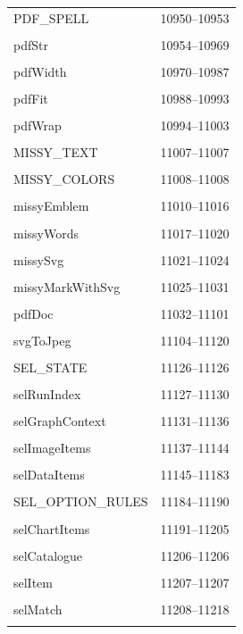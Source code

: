 {\begin{longtable}{@{}p{11cm}r@{}}
PDF\_SPELL & 10950--10953 \\\\\hline
pdfStr & 10954--10969 \\\\\hline
pdfWidth & 10970--10987 \\\\\hline
pdfFit & 10988--10993 \\\\\hline
pdfWrap & 10994--11003 \\\\\hline
MISSY\_TEXT & 11007--11007 \\\\\hline
MISSY\_COLORS & 11008--11008 \\\\\hline
missyEmblem & 11010--11016 \\\\\hline
missyWords & 11017--11020 \\\\\hline
missySvg & 11021--11024 \\\\\hline
missyMarkWithSvg & 11025--11031 \\\\\hline
pdfDoc & 11032--11101 \\\\\hline
svgToJpeg & 11104--11120 \\\\\hline
SEL\_STATE & 11126--11126 \\\\\hline
selRunIndex & 11127--11130 \\\\\hline
selGraphContext & 11131--11136 \\\\\hline
selImageItems & 11137--11144 \\\\\hline
selDataItems & 11145--11183 \\\\\hline
SEL\_OPTION\_RULES & 11184--11190 \\\\\hline
selChartItems & 11191--11205 \\\\\hline
selCatalogue & 11206--11206 \\\\\hline
selItem & 11207--11207 \\\\\hline
selMatch & 11208--11218 \\\\\hline

\end{longtable}}
